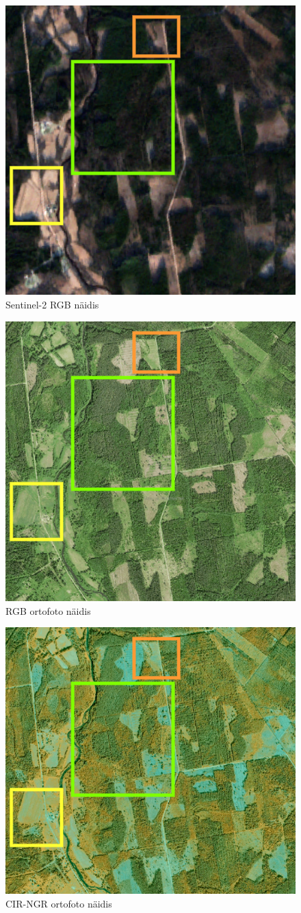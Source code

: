 \begin{figure}[H]
    \centering
    \includegraphics[width=.6\textwidth]{figures/andmestik/tuvastamis_sent2_naidis.drawio.png}
    \caption{Sentinel-2 RGB näidis}
    \label{fig:sent_mask_naidis}
\end{figure}

\begin{figure}[H]
    \centering
    \includegraphics[width=.6\textwidth]{figures/andmestik/tuvastamis_orto_naidis.drawio.png}
    \caption{RGB ortofoto näidis}
    \label{fig:orto_mask_naidis}
\end{figure}

\begin{figure}[H]
    \centering
    \includegraphics[width=.6\textwidth]{figures/andmestik/tuvastamis_orto_nir_naidis.drawio.png}
    \caption{CIR-NGR ortofoto näidis}
    \label{fig:orto_nir_mask_naidis}
\end{figure}
